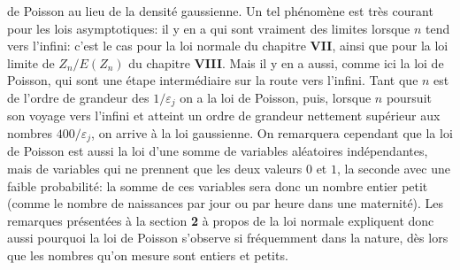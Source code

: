 de Poisson au lieu de la densit\'e gaussienne.   
\medskip 
Un tel ph\'enom\`ene est tr\`es courant pour les lois asymptotiques:  il y  
en a qui sont vraiment des limites lorsque $n$ tend vers l'infini:  c'est le 
cas pour la loi normale du chapitre {\bf VII},  ainsi que pour la loi limite 
de $Z_n/E(Z_n)$ du chapitre {\bf VIII}.  Mais il y en a aussi,  comme ici
la loi de Poisson,  qui sont une \'etape interm\'ediaire sur la route vers 
l'infini.  Tant que $n$ est de l'ordre de grandeur des $1/\varepsilon_j$ on 
a la loi de Poisson,  puis,  lorsque $n$ poursuit son voyage vers l'infini et 
atteint un ordre de grandeur nettement sup\'erieur aux nombres 
$400/\varepsilon_j$,  on arrive \`a la loi gaussienne. 
\medskip 
On remarquera cependant que la loi de Poisson est aussi la loi d'une 
somme de variables al\'eatoires ind\'ependantes,  mais de variables qui  
ne prennent que les deux valeurs $0$ et $1$,  la seconde avec une faible 
probabilit\'e:  la somme de ces variables sera donc un nombre entier 
petit (comme le nombre de naissances par jour ou par heure dans une 
maternit\'e).  Les remarques pr\'esent\'ees \`a la section {\bf 2} \`a
propos de la loi normale expliquent donc aussi pourquoi la loi de Poisson
s'observe si fr\'equemment dans la nature,  d\`es lors que les nombres
qu'on mesure sont entiers et petits. 
 
\bigskip 
 
